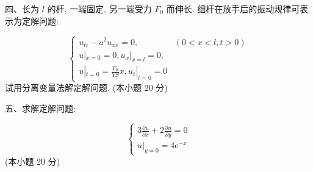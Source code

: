 \documentclass{article}
\theoremstyle{nonumberplain}
\newcommand{\ee}{\mathrm{e}}
\begin{document}
    \begin{flushleft}
    	四、长为 $l$ 的杆, 一端固定, 另一端受力 $F_{0}$ 而伸长. 细杆在放手后的振动规律可表示为定解问题:
    \end{flushleft}
    \begin{equation*}
    \begin{cases}
    u_{tt}-a^2 u_{xx}=0, & (0<x<l,t>0)\\
    u|_{x=0}=0,u_{x}|_{x=l}=0,\\
    u|_{t=0}=\frac{F_{0}}{YS}x,u_{t}|_{t=0}=0
    \end{cases}
    \end{equation*}
    试用分离变量法解定解问题. (本小题 $20$ 分)
    
    \begin{flushleft}
    	五、求解定解问题:
    \end{flushleft}
    \begin{equation*}
    \begin{cases}
    3\frac{\partial u}{\partial x}+2\frac{\partial u}{\partial y}=0\\
    u|_{y=0}=4\ee^{-x}
    \end{cases}
    \end{equation*}(本小题 $20$ 分)
    
\end{document}
